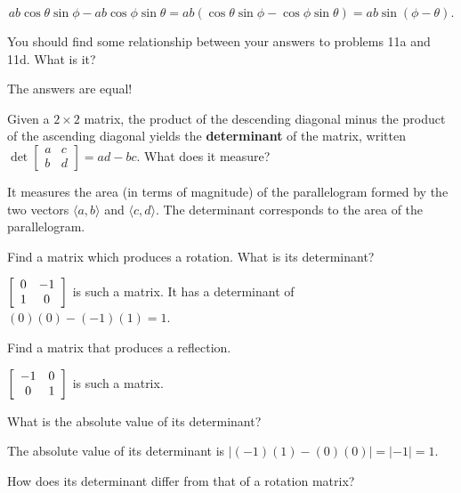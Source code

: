 \documentclass[../key.tex]{subfiles}
\begin{document}
$$ab\cos\theta\sin\phi - ab\cos\phi\sin\theta = ab(\cos\theta\sin\phi - \cos\phi\sin\theta) = ab\sin(\phi - \theta).$$

\begin{inner_problem}
\item You should find some relationship between your answers to problems 11a and 11d. What is it?
\end{inner_problem}

The answers are equal! 

\begin{inner_problem}
\item Given a $2\times 2$ matrix, the product of the descending diagonal minus the product of the ascending diagonal yields the \textbf{determinant} of the matrix, written $\det \left[\begin{array}{cc}a & c \\ b & d \end{array}\right]=ad-bc$. What does it measure?
\end{inner_problem}

It measures the area (in terms of magnitude) of the parallelogram formed by the two vectors $\langle a,b\rangle$ and $\langle c,d\rangle$. The determinant corresponds to the area of the parallelogram.

\begin{inner_problem}
\item Find a matrix which produces a rotation. What is its determinant?
\end{inner_problem}

$\left[\begin{array}{cc} 0 & -1 \\ 1 & 0 \end{array}\right]$ is such a matrix. It has a determinant of $(0)(0)-(-1)(1)=1$.

\begin{inner_problem}
\item Find a matrix that produces a reflection.
\end{inner_problem}

$\left[\begin{array}{cc} -1 & 0 \\ 0 & 1 \end{array}\right]$ is such a matrix.

\begin{iinner_problem}
\item What is the absolute value of its determinant?
\end{iinner_problem}

The absolute value of its determinant is $|(-1)(1)-(0)(0)|=|-1|=1$.

\begin{iinner_problem}
\item How does its determinant differ from that of a rotation matrix?
\end{iinner_problem}
\end{document}
